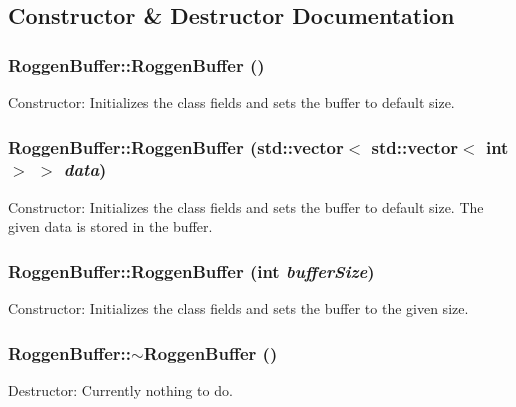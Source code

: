 \subsection{Constructor \& Destructor Documentation}
\hypertarget{classRoggenBuffer_a64573713834ff7772db6e180d9b34be6}{
\subsubsection[{RoggenBuffer}]{\setlength{\rightskip}{0pt plus 5cm}RoggenBuffer::RoggenBuffer ()}}
\label{classRoggenBuffer_a64573713834ff7772db6e180d9b34be6}
Constructor: Initializes the class fields and sets the buffer to default size. \hypertarget{classRoggenBuffer_a54b6110634f1f2d1a38552d58b841bf8}{
\subsubsection[{RoggenBuffer}]{\setlength{\rightskip}{0pt plus 5cm}RoggenBuffer::RoggenBuffer (std::vector$<$ std::vector$<$ int $>$ $>$ {\em data})}}
\label{classRoggenBuffer_a54b6110634f1f2d1a38552d58b841bf8}
Constructor: Initializes the class fields and sets the buffer to default size. The given data is stored in the buffer. \hypertarget{classRoggenBuffer_aaff7360a2f18576aeb9a5164a6cf6eec}{
\subsubsection[{RoggenBuffer}]{\setlength{\rightskip}{0pt plus 5cm}RoggenBuffer::RoggenBuffer (int {\em bufferSize})}}
\label{classRoggenBuffer_aaff7360a2f18576aeb9a5164a6cf6eec}
Constructor: Initializes the class fields and sets the buffer to the given size. \hypertarget{classRoggenBuffer_a575b9194c53270add2d11e119d070293}{
\subsubsection[{$\sim$RoggenBuffer}]{\setlength{\rightskip}{0pt plus 5cm}RoggenBuffer::$\sim$RoggenBuffer ()}}
\label{classRoggenBuffer_a575b9194c53270add2d11e119d070293}
Destructor: Currently nothing to do. 

